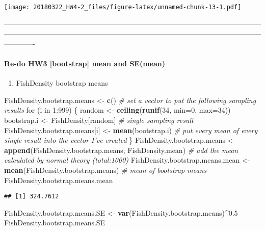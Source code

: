 \documentclass[]{article}
\newenvironment{Shaded}{\begin{snugshade}}{\end{snugshade}}
\newcommand{\KeywordTok}[1]{\textcolor[rgb]{0.13,0.29,0.53}{\textbf{{#1}}}}
\newcommand{\DataTypeTok}[1]{\textcolor[rgb]{0.13,0.29,0.53}{{#1}}}
\newcommand{\DecValTok}[1]{\textcolor[rgb]{0.00,0.00,0.81}{{#1}}}
\newcommand{\FloatTok}[1]{\textcolor[rgb]{0.00,0.00,0.81}{{#1}}}
\newcommand{\StringTok}[1]{\textcolor[rgb]{0.31,0.60,0.02}{{#1}}}
\newcommand{\CommentTok}[1]{\textcolor[rgb]{0.56,0.35,0.01}{\textit{{#1}}}}
\newcommand{\NormalTok}[1]{{#1}}
\providecommand{\tightlist}{%
  \setlength{\itemsep}{0pt}\setlength{\parskip}{0pt}}
\let\oldparagraph\paragraph
\renewcommand{\paragraph}[1]{\oldparagraph{#1}\mbox{}}
\begin{document}
\texttt{[image: 20180322\_HW4-2\_files/figure-latex/unnamed-chunk-13-1.pdf]}

-------------------------------------------------------------------------------------------------------------------------------------------------------------------------------------------------------------------------------------

\paragraph{Re-do HW3 {[}bootstrap{]} mean and
SE(mean)}\label{re-do-hw3-bootstrap-mean-and-semean}

\begin{enumerate}
\def\labelenumi{(\arabic{enumi})}
\tightlist
\item
  FishDensity bootstrap means
\end{enumerate}

\begin{Shaded}
\begin{Highlighting}[]
\NormalTok{FishDensity.bootstrap.means <-}\StringTok{ }\KeywordTok{c}\NormalTok{() }\CommentTok{# set a vector to put the following sampling results}
\NormalTok{for (i in }\DecValTok{1}\NormalTok{:}\DecValTok{999}\NormalTok{) \{}
\NormalTok{random <-}\StringTok{ }\KeywordTok{ceiling}\NormalTok{(}\KeywordTok{runif}\NormalTok{(}\DecValTok{34}\NormalTok{, }\DataTypeTok{min=}\DecValTok{0}\NormalTok{, }\DataTypeTok{max=}\DecValTok{34}\NormalTok{))}
\NormalTok{bootstrap.i <-}\StringTok{ }\NormalTok{FishDensity[random] }\CommentTok{# single sampling result}
\NormalTok{FishDensity.bootstrap.means[i] <-}\StringTok{ }\KeywordTok{mean}\NormalTok{(bootstrap.i) }\CommentTok{# put every mean of every single result into the vector I've created}
\NormalTok{\}}
\NormalTok{FishDensity.bootstrap.means <-}\StringTok{ }\KeywordTok{append}\NormalTok{(FishDensity.bootstrap.means, FishDensity.mean) }\CommentTok{# add the mean calculated by normal theory (total:1000)}
\NormalTok{FishDensity.bootstrap.means.mean <-}\StringTok{ }\KeywordTok{mean}\NormalTok{(FishDensity.bootstrap.means) }\CommentTok{# mean of bootstrap means}
\NormalTok{FishDensity.bootstrap.means.mean}
\end{Highlighting}
\end{Shaded}

\begin{verbatim}
## [1] 324.7612
\end{verbatim}

\begin{Shaded}
\begin{Highlighting}[]
\NormalTok{FishDensity.bootstrap.means.SE <-}\StringTok{ }\KeywordTok{var}\NormalTok{(FishDensity.bootstrap.means)^}\FloatTok{0.5}
\NormalTok{FishDensity.bootstrap.means.SE}
\end{Highlighting}
\end{Shaded}
\end{document}
